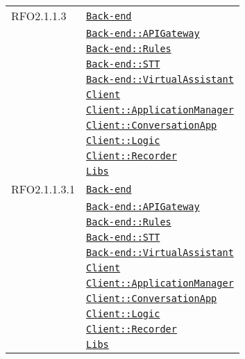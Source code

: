 \begin{longtable}{|>{\centering}m{3cm}|m{10cm}<{\centering}|}
RFO2.1.1.3 & \hyperref[Back-end]{\texttt{Back-end}}\\
& \hyperref[Back-end::APIGateway]{\texttt{Back-end::APIGateway}}\\
& \hyperref[Back-end::Rules]{\texttt{Back-end::Rules}}\\
& \hyperref[Back-end::STT]{\texttt{Back-end::STT}}\\
& \hyperref[Back-end::VirtualAssistant]{\texttt{Back-end::VirtualAssistant}}\\
& \hyperref[Client]{\texttt{Client}}\\
& \hyperref[Client::ApplicationManager]{\texttt{Client::ApplicationManager}}\\
& \hyperref[Client::ConversationApp]{\texttt{Client::ConversationApp}}\\
& \hyperref[Client::Logic]{\texttt{Client::Logic}}\\
& \hyperref[Client::Recorder]{\texttt{Client::Recorder}}\\
& \hyperref[Libs]{\texttt{Libs}}\\ \hline

RFO2.1.1.3.1 & \hyperref[Back-end]{\texttt{Back-end}}\\
& \hyperref[Back-end::APIGateway]{\texttt{Back-end::APIGateway}}\\
& \hyperref[Back-end::Rules]{\texttt{Back-end::Rules}}\\
& \hyperref[Back-end::STT]{\texttt{Back-end::STT}}\\
& \hyperref[Back-end::VirtualAssistant]{\texttt{Back-end::VirtualAssistant}}\\
& \hyperref[Client]{\texttt{Client}}\\
& \hyperref[Client::ApplicationManager]{\texttt{Client::ApplicationManager}}\\
& \hyperref[Client::ConversationApp]{\texttt{Client::ConversationApp}}\\
& \hyperref[Client::Logic]{\texttt{Client::Logic}}\\
& \hyperref[Client::Recorder]{\texttt{Client::Recorder}}\\
& \hyperref[Libs]{\texttt{Libs}}\\ \hline


\end{longtable}
